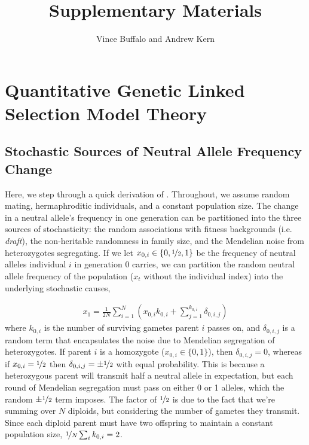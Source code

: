 \documentclass[11pt]{article}
\title{Supplementary Materials}
\author{Vince Buffalo and Andrew Kern}
\begin{document}
\maketitle

\tableofcontents

\section{Quantitative Genetic Linked Selection Model Theory}
\label{suppsec:theory}

\subsection{Stochastic Sources of Neutral Allele Frequency Change}

Here, we step through a quick derivation of \textcite{Santiago1995-hx}.
Throughout, we assume random mating, hermaphroditic individuals, and a constant
population size. The change in a neutral allele's frequency in one generation
can be partitioned into the three sources of stochasticity: the random
associations with fitness backgrounds (i.e. \emph{draft}), the non-heritable
randomness in family size, and the Mendelian noise from heterozygotes
segregating. If we let $x_{0,i} \in \{0, \nicefrac{1}{2}, 1\}$ be the frequency
of neutral alleles individual $i$ in generation 0 carries, we can partition the
random neutral allele frequency of the population ($x_t$ without the individual
index) into the underlying stochastic causes,

\begin{align}
  x_1 = \frac{1}{2N} \sum_{i=1}^N \left( x_{0,i}k_{0,i} + \sum_{j=1}^{k_{0,i}} \delta_{0,i,j} \right)
\end{align}
%
where $k_{0,i}$ is the number of surviving gametes parent $i$ passes on, and
$\delta_{0,i,j}$ is a random term that encapsulates the noise due to Mendelian
segregation of heterozygotes. If parent $i$ is a homozygote ($x_{0,i} \in \{0,
1\}$), then $\delta_{0,i,j} = 0$, whereas if $x_{0,i} = \nicefrac{1}{2}$ then
$\delta_{0,i,j} = \pm \nicefrac{1}{2}$ with equal probability. This is because
a heterozygous parent will transmit half a neutral allele in expectation, but
each round of Mendelian segregation must pass on either 0 or 1 alleles, which
the random $\pm \nicefrac{1}{2}$ term imposes. The factor of $\nicefrac{1}{2}$
is due to the fact that we're summing over $N$ diploids, but considering the
number of gametes they transmit. Since each diploid parent must have two
offspring to maintain a constant population size, $\nicefrac{1}{N} \sum_i
k_{0,i} = 2$. 
\end{document}
